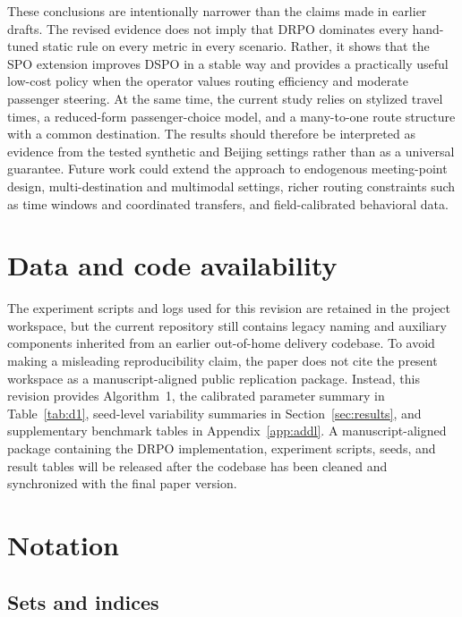 \documentclass[preprint,12pt,authoryear]{elsarticle}
\begin{document}
These conclusions are intentionally narrower than the claims made in earlier drafts. The revised evidence does not imply that DRPO dominates every hand-tuned static rule on every metric in every scenario. Rather, it shows that the SPO extension improves DSPO in a stable way and provides a practically useful low-cost policy when the operator values routing efficiency and moderate passenger steering. At the same time, the current study relies on stylized travel times, a reduced-form passenger-choice model, and a many-to-one route structure with a common destination. The results should therefore be interpreted as evidence from the tested synthetic and Beijing settings rather than as a universal guarantee. Future work could extend the approach to endogenous meeting-point design, multi-destination and multimodal settings, richer routing constraints such as time windows and coordinated transfers, and field-calibrated behavioral data.

\section{Data and code availability}
\label{sec:data}

The experiment scripts and logs used for this revision are retained in the project workspace, but the current repository still contains legacy naming and auxiliary components inherited from an earlier out-of-home delivery codebase. To avoid making a misleading reproducibility claim, the paper does not cite the present workspace as a manuscript-aligned public replication package. Instead, this revision provides Algorithm~1, the calibrated parameter summary in Table~\ref{tab:d1}, seed-level variability summaries in Section~\ref{sec:results}, and supplementary benchmark tables in Appendix~\ref{app:addl}. A manuscript-aligned package containing the DRPO implementation, experiment scripts, seeds, and result tables will be released after the codebase has been cleaned and synchronized with the final paper version.

\appendix

\section{Notation}
\label{app:notation}

\subsection{Sets and indices}
\end{document}
